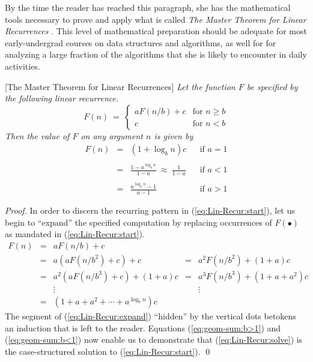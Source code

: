 \documentclass{article}
\begin{document}
By the time the reader has reached this paragraph, she has the
mathematical tools necessary to prove and apply what is called {\it
  The Master Theorem for Linear Recurrences} \cite{CLRS}.  This level
of mathematical preparation should be adequate for most
early-undergrad courses on data structures and algorithms, as well for
for analyzing a large fraction of the algorithms that she is likely to
encounter in daily activities.

[The Master Theorem for Linear Recurrences]
\label{thm:master-thm}
{\it 
Let the function $F$ be specified by the following linear recurrence.}
\begin{equation}
\label{eq:Lin-Recur:start}
F(n) \ = \ \left\{
\begin{array}{cl}
a F(n/b) + c & \mbox{for } n \geq b \\
c & \mbox{for } n < b
\end{array}
\right.
\end{equation}
{\it
Then the value of $F$ on any argument $n$ is given by}
\begin{equation}
\label{eq:Lin-Recur:solve}
\begin{array}{lclll}
F(n) & = & (1 + \log_b n)c &  & \mbox{if } a=1 \\
     &   &                 &  & \\
     & = &
  {\displaystyle
  \frac{1-a^{\log_b n}}{1-a} \ \approx \ \frac{1}{1-a}
  }
 &  & \mbox{if } a<1 \\
    &   &                  & & \\
    & = &
  {\displaystyle
\frac{a^{\log_b n} -1}{a-1}
  }
 & & \mbox{if } a>1
\end{array}
\end{equation}


\begin{proof}
In order to discern the recurring pattern in
(\ref{eq:Lin-Recur:start}), let us begin to ``expand'' the specified
computation by replacing occurrences of $F(\bullet)$ as mandated in
(\ref{eq:Lin-Recur:start}).
\begin{equation}
\label{eq:Lin-Recur:expand}
\begin{array}{lcccc}
F(n) & = & a F(n/b) + c & & \\
     & = & a \left( a F(n/b^2) + c \right) + c
             & = & a^2 F(n/b^2) + (1 + a)c \\
     & = & a^2 \left( a F(n/b^3) + c \right) + (1+a)c
             & = & a^3 F(n/b^3) + (1 + a + a^2)c \\
     &   & \vdots & & \vdots \\
     & = & 
{\displaystyle
\left( 1 + a + a^2 + \cdots + a^{\log_b n} \right) c
} & &
\end{array}
\end{equation}
The segment of (\ref{eq:Lin-Recur:expand}) ``hidden'' by the vertical
dots betokens an induction that is left to the reader.  Equations
(\ref{eq:geom-sum:b>1}) and (\ref{eq:geom-sum:b<1}) now enable us to
demonstrate that (\ref{eq:Lin-Recur:solve}) is the case-structured
solution to (\ref{eq:Lin-Recur:start}).  \qed
\end{proof}
\end{document}
